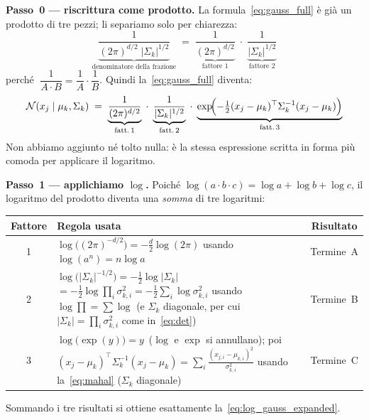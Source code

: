 \documentclass[11pt,a4paper]{article}
\begin{document}
\begin{infobox}

\textbf{Passo~0 --- riscrittura come prodotto.}
La formula~\eqref{eq:gauss_full} \`{e} gi\`{a} un prodotto di tre
pezzi; li separiamo solo per chiarezza:
\[
  \underbrace{
    \frac{1}{(2\pi)^{d/2} \; |\Sigma_k|^{1/2}}
  }_{\text{denominatore della frazione}}
  \;=\;
  \underbrace{\frac{1}{(2\pi)^{d/2}}}_{\text{fattore 1}}
  \;\cdot\;
  \underbrace{\frac{1}{|\Sigma_k|^{1/2}}}_{\text{fattore 2}}
\]
perch\'{e} $\;\dfrac{1}{A \cdot B} = \dfrac{1}{A}\cdot\dfrac{1}{B}$.
Quindi la~\eqref{eq:gauss_full} diventa:
\[
  \mathcal{N}(x_j \mid \mu_k,\Sigma_k)
  \;=\;
  \underbrace{\frac{1}{(2\pi)^{d/2}}}_{\text{fatt.\,1}}
  \;\cdot\;
  \underbrace{\frac{1}{|\Sigma_k|^{1/2}}}_{\text{fatt.\,2}}
  \;\cdot\;
  \underbrace{\exp\!\Bigl(-\tfrac{1}{2}(x_j-\mu_k)^\top
              \Sigma_k^{-1}(x_j-\mu_k)\Bigr)}_{\text{fatt.\,3}}
\]
Non abbiamo aggiunto n\'{e} tolto nulla: \`{e} la stessa espressione
scritta in forma pi\`{u} comoda per applicare il logaritmo.

\medskip
\textbf{Passo~1 --- applichiamo $\log$.}
Poich\'{e} $\log(a \cdot b \cdot c) = \log a + \log b + \log c$,
il logaritmo del prodotto diventa una \emph{somma} di tre logaritmi:

\begin{center}
\renewcommand{\arraystretch}{1.6}
\begin{tabular}{c p{5.8cm} c}
\toprule
\textbf{Fattore} & \textbf{Regola usata} & \textbf{Risultato} \\
\midrule
1 &
$\log\bigl((2\pi)^{-d/2}\bigr) = -\frac{d}{2}\log(2\pi)$
\newline usando $\log(a^n)=n\log a$
& Termine~A \\
2 &
$\log\bigl(|\Sigma_k|^{-1/2}\bigr) = -\frac{1}{2}\log|\Sigma_k|$
\newline $= -\frac{1}{2}\log\!\prod_i \sigma_{k,i}^2
         = -\frac{1}{2}\sum_i \log\sigma_{k,i}^2$
\newline usando $\log\!\prod = \sum\log$ (e $\Sigma_k$ diagonale,
\newline per cui $|\Sigma_k| = \prod_i\sigma_{k,i}^2$ come in~\eqref{eq:det})
& Termine~B \\
3 &
$\log\bigl(\exp(y)\bigr) = y$ \,($\log$ e $\exp$ si annullano);
\newline poi $(x_j{-}\mu_k)^\top\Sigma_k^{-1}(x_j{-}\mu_k)
       = \sum_i\frac{(x_{j,i}{-}\mu_{k,i})^2}{\sigma_{k,i}^2}$
\newline usando la~\eqref{eq:mahal} ($\Sigma_k$ diagonale)
& Termine~C \\
\bottomrule
\end{tabular}
\end{center}
\medskip
Sommando i tre risultati si ottiene esattamente la~\eqref{eq:log_gauss_expanded}.


\end{infobox}
\end{document}
